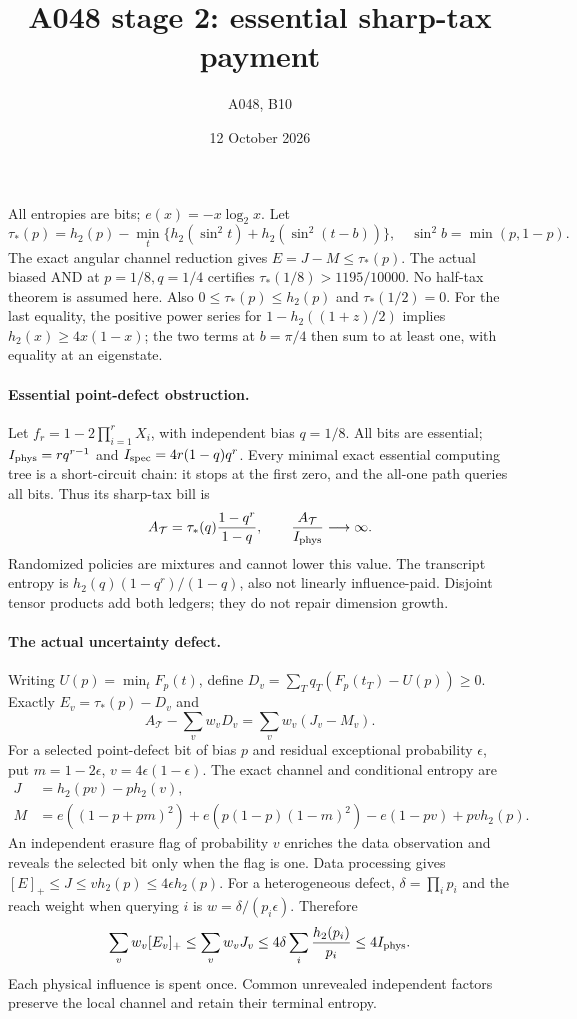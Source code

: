 \documentclass[11pt]{article}
\begin{document}
\title{A048 stage 2: essential sharp-tax payment}
\author{A048, B10}\date{12 October 2026}\maketitle
All entropies are bits; $e(x)=-x\log_2x$. Let
\[
 \tau_*(p)=h_2(p)-\min_t\{h_2(\sin^2t)+h_2(\sin^2(t-b))\},
 \quad\sin^2b=\min(p,1-p).
\]
The exact angular channel reduction gives $E=J-M\le\tau_*(p)$.
The actual biased AND at $p=1/8,q=1/4$ certifies
$\tau_*(1/8)>1195/10000$. No half-tax theorem is assumed here.
Also $0\le\tau_*(p)\le h_2(p)$ and $\tau_*(1/2)=0$.
For the last equality, the positive power series for $1-h_2((1+z)/2)$
implies $h_2(x)\ge4x(1-x)$; the two terms at $b=\pi/4$ then sum to at least one,
with equality at an eigenstate.

\paragraph{Essential point-defect obstruction.}
Let $f_r=1-2\prod_{i=1}^r X_i$, with independent bias $q=1/8$.
All bits are essential; $I_{\rm phys}=rq^{r-1}$ and
$I_{\rm spec}=4r(1-q)q^r$.
Every minimal exact essential computing tree is a short-circuit chain:
it stops at the first zero, and the all-one path queries all bits.
Thus its sharp-tax bill is
\[
 A_{\mathcal T}=\tau_*(q)\frac{1-q^r}{1-q},\qquad
 \frac{A_{\mathcal T}}{I_{\rm phys}}\longrightarrow\infty.
\]
Randomized policies are mixtures and cannot lower this value.
The transcript entropy is $h_2(q)(1-q^r)/(1-q)$, also not linearly influence-paid.
Disjoint tensor products add both ledgers; they do not repair dimension growth.

\paragraph{The actual uncertainty defect.}
Writing $U(p)=\min_tF_p(t)$, define
$D_v=\sum_T q_T(F_p(t_T)-U(p))\ge0$.
Exactly $E_v=\tau_*(p)-D_v$ and
\[
 A_{\mathcal T}-\sum_vw_vD_v=\sum_vw_v(J_v-M_v).
\]
For a selected point-defect bit of bias $p$ and residual exceptional probability
$\epsilon$, put $m=1-2\epsilon$, $v=4\epsilon(1-\epsilon)$.
The exact channel and conditional entropy are
\begin{align*}
 J&=h_2(pv)-p h_2(v),\\
 M&=e((1-p+pm)^2)+e(p(1-p)(1-m)^2)-e(1-pv)+pv h_2(p).
\end{align*}
An independent erasure flag of probability $v$ enriches the data observation and
reveals the selected bit only when the flag is one. Data processing gives
$[E]_+\le J\le v h_2(p)\le4\epsilon h_2(p)$.
For a heterogeneous defect, $\delta=\prod_i p_i$ and the reach weight when
querying $i$ is $w=\delta/(p_i\epsilon)$. Therefore
\[
 \sum_vw_v[E_v]_+\le\sum_vw_vJ_v
 \le4\delta\sum_i\frac{h_2(p_i)}{p_i}\le4I_{\rm phys}.
\]
Each physical influence is spent once. Common unrevealed independent factors
preserve the local channel and retain their terminal entropy.
\end{document}
